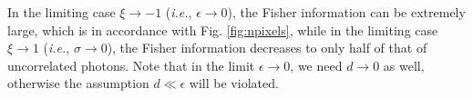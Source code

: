 In the limiting case $\xi\rightarrow-1$ (\emph{i.e.}, $\epsilon\rightarrow0$), the Fisher information can be extremely large, which is in accordance with Fig. \ref{fig:npixels}, while in the limiting case $\xi\rightarrow1$ (\emph{i.e.}, $\sigma\rightarrow0$), the Fisher information decreases to only half of that of uncorrelated photons. 
Note that in the limit $\epsilon\rightarrow0$, we need $d\rightarrow0$ as well, otherwise the assumption $d\ll\epsilon$ will be violated. 

